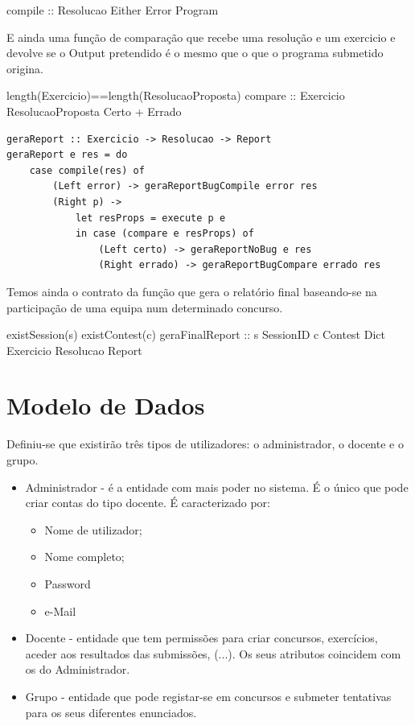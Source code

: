 \prop
{ }
{compile :: Resolucao \rarrow Either Error Program}
{ }

E ainda uma função de comparação que recebe uma resolução e um exercicio e devolve se o Output pretendido é o mesmo que o que o programa submetido origina.

\prop
{ length(Exercicio)==length(ResolucaoProposta)}
{compare :: Exercicio \rarrow ResolucaoProposta \rarrow Certo + Errado}
{ }

\begin{lstlisting}[language=HaskellUlisses]
geraReport :: Exercicio -> Resolucao -> Report
geraReport e res = do
	case compile(res) of
		(Left error) -> geraReportBugCompile error res
		(Right p) ->
			let resProps = execute p e
			in case (compare e resProps) of
				(Left certo) -> geraReportNoBug e res
				(Right errado) -> geraReportBugCompare errado res
\end{lstlisting}


Temos ainda o contrato da função que gera o relatório final baseando-se na participação de uma equipa num determinado concurso.

\prop
{ existSession(s) \wedge existContest(c) \wedge }
{geraFinalReport :: s \unif SessionID \rarrow c \unif Contest \rarrow Dict Exercicio Resolucao \rarrow Report}
{ }

\section{Modelo de Dados}\label{sec modedados}

Definiu-se que existirão três tipos de utilizadores: o administrador, o docente e o grupo.\\

\begin{itemize}
  \item Administrador - é a entidade com mais poder no sistema. É o único que pode criar contas do tipo docente. É caracterizado por:
    \begin{itemize}
      \item Nome de utilizador;
      \item Nome completo;
      \item Password
      \item e-Mail
    \end{itemize}
  \item Docente - entidade que tem permissões para criar concursos, exercícios, aceder aos resultados das submissões, (...). 
Os seus atributos coincidem com os do Administrador.
  \item Grupo - entidade que pode registar-se em concursos e submeter tentativas para os seus diferentes enunciados.
\end{itemize}

